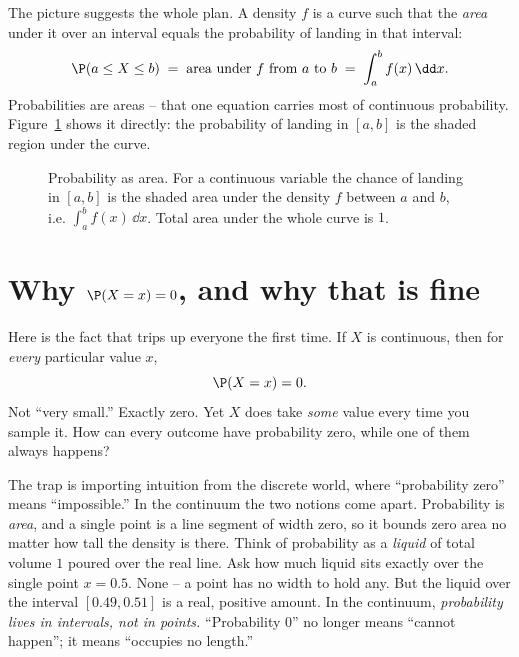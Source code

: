 The picture suggests the whole plan. A density $f$ is a curve such that the
\emph{area} under it over an interval equals the probability of landing in that
interval:
\[
  \P(a \le X \le b) \;=\; \text{area under } f \text{ from } a \text{ to } b
  \;=\; \int_a^b f(x)\,\dd x .
\]
Probabilities are areas -- that one equation carries most of continuous
probability. Figure~\ref{ch10:fig-area} shows it directly: the probability of
landing in $[a,b]$ is the shaded region under the curve.

\begin{figure}[H]
\centering
{}
\caption{Probability as area. For a continuous variable the chance of landing in
$[a,b]$ is the shaded area under the density $f$ between $a$ and $b$, i.e.
$\int_a^b f(x)\,\dd x$. Total area under the whole curve is $1$.}
\label{ch10:fig-area}
\end{figure}

\section{Why \texorpdfstring{$\P(X=x)=0$}{P(X=x)=0}, and why that is fine}
\label{ch10:point-mass-zero}

Here is the fact that trips up everyone the first time. If $X$ is continuous, then
for \emph{every} particular value $x$,
\[
  \P(X = x) = 0 .
\]
Not ``very small.'' Exactly zero. Yet $X$ does take \emph{some} value every time
you sample it. How can every outcome have probability zero, while one of them
always happens?

\begin{happeningbox}
The trap is importing intuition from the discrete world, where ``probability zero''
means ``impossible.'' In the continuum the two notions come apart. Probability is
\emph{area}, and a single point is a line segment of width zero, so it bounds zero
area no matter how tall the density is there. Think of probability as a
\emph{liquid} of total volume $1$ poured over the real line. Ask how much liquid
sits exactly over the single point $x=0.5$. None -- a point has no width to hold any.
But the liquid over the interval $[0.49,0.51]$ is a real, positive amount. In the
continuum, \emph{probability lives in intervals, not in points.} ``Probability $0$''
no longer means ``cannot happen''; it means ``occupies no length.''
\end{happeningbox}

